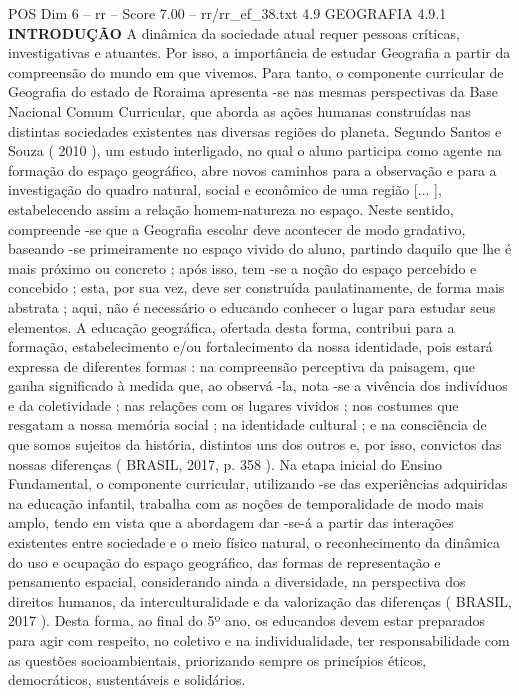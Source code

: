 \begin{textsample}{POS Dim 6 – rr – Score 7.00 – rr/rr\_ef\_38.txt}  \label{ex:f6_pos_217}
4.9 GEOGRAFIA 4.9.1 \textbf{INTRODUÇÃO} A dinâmica da sociedade atual requer pessoas críticas, investigativas e atuantes.
Por isso, a importância de estudar Geografia a partir da compreensão do mundo em que vivemos.
Para tanto, o componente curricular de Geografia do estado de Roraima apresenta -se nas mesmas perspectivas da Base Nacional Comum Curricular, que aborda as ações humanas construídas nas distintas sociedades existentes nas diversas regiões do planeta.
Segundo Santos e Souza ( 2010 ), um estudo interligado, no qual o aluno participa como agente na formação do espaço geográfico, abre novos caminhos para a observação e para a investigação do quadro natural, social e econômico de uma região [... ], estabelecendo assim a relação homem-natureza no espaço.
Neste sentido, compreende -se que a Geografia escolar deve acontecer de modo gradativo, baseando -se primeiramente no espaço vivido do aluno, partindo daquilo que lhe é mais próximo ou concreto ; após isso, tem -se a noção do espaço percebido e concebido ; esta, por sua vez, deve ser construída paulatinamente, de forma mais abstrata ; aqui, não é necessário o educando conhecer o lugar para estudar seus elementos.
A educação geográfica, ofertada desta forma, contribui para a formação, estabelecimento e/ou fortalecimento da nossa identidade, pois estará expressa de diferentes formas : na compreensão perceptiva da paisagem, que ganha significado à medida que, ao observá -la, nota -se a vivência dos indivíduos e da coletividade ; nas relações com os lugares vividos ; nos costumes que resgatam a nossa memória social ; na identidade cultural ; e na consciência de que somos sujeitos da história, distintos uns dos outros e, por isso, convictos das nossas diferenças ( BRASIL, 2017, p. 358 ).
Na etapa inicial do Ensino Fundamental, o componente curricular, utilizando -se das experiências adquiridas na educação infantil, trabalha com as noções de temporalidade de modo mais amplo, tendo em vista que a abordagem dar -se-á a partir das interações existentes entre sociedade e o meio físico natural, o reconhecimento da dinâmica do uso e ocupação do espaço geográfico, das formas de representação e pensamento espacial, considerando ainda a diversidade, na perspectiva dos direitos humanos, da interculturalidade e da valorização das diferenças ( BRASIL, 2017 ).
Desta forma, ao final do 5º ano, os educandos devem estar preparados para agir com respeito, no coletivo e na individualidade, ter responsabilidade com as questões socioambientais, priorizando sempre os princípios éticos, democráticos, sustentáveis e solidários.

\end{textsample}
